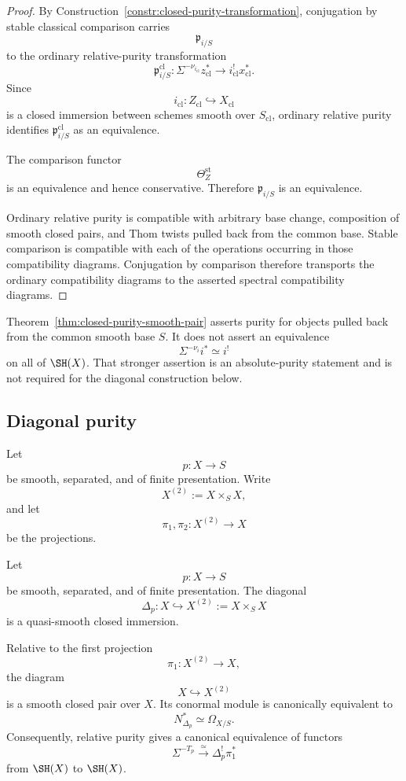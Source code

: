 \begin{proof}
By Construction~\ref{constr:closed-purity-transformation}, conjugation by
stable classical comparison carries
\[
    \mathfrak p_{i/S}
\]
to the ordinary relative-purity transformation
\[
    \mathfrak p^{\mathrm{cl}}_{i/S}:
    \Sigma^{-\nu_{i_{\mathrm{cl}}}}
    z_{\mathrm{cl}}^*
    \longrightarrow
    i_{\mathrm{cl}}^!x_{\mathrm{cl}}^*.
\]
Since
\[
    i_{\mathrm{cl}}:
    Z_{\mathrm{cl}}
    \hookrightarrow
    X_{\mathrm{cl}}
\]
is a closed immersion between schemes smooth over \(S_{\mathrm{cl}}\),
ordinary relative purity identifies
\(\mathfrak p^{\mathrm{cl}}_{i/S}\) as an equivalence.

The comparison functor
\[
    \Theta_Z^{\mathrm{st}}
\]
is an equivalence and hence conservative.  Therefore
\(\mathfrak p_{i/S}\) is an equivalence.

Ordinary relative purity is compatible with arbitrary base change,
composition of smooth closed pairs, and Thom twists pulled back from the
common base.  Stable comparison is
compatible with each of the operations occurring in those compatibility
diagrams.  Conjugation by comparison therefore transports the ordinary
compatibility diagrams to the asserted spectral compatibility diagrams.
\end{proof}

\begin{remark}
\label{rem:closed-purity-scope}
Theorem~\ref{thm:closed-purity-smooth-pair} asserts purity for objects pulled
back from the common smooth base \(S\).  It does not assert an equivalence
\[
    \Sigma^{-\nu_i}i^*
    \simeq
    i^!
\]
on all of \(\SH(X)\).  That stronger assertion is an absolute-purity
statement and is not required for the diagonal construction below.
\end{remark}

\subsection{Diagonal purity}

Let
\[
    p:X\longrightarrow S
\]
be smooth, separated, and of finite presentation.  Write
\[
    X^{(2)}
    :=
    X\times_SX,
\]
and let
\[
    \pi_1,\pi_2:X^{(2)}\longrightarrow X
\]
be the projections.

\begin{proposition}
\label{prop:smooth-diagonal-purity}
Let
\[
    p:X\longrightarrow S
\]
be smooth, separated, and of finite presentation.  The diagonal
\[
    \Delta_p:
    X\hookrightarrow X^{(2)}
    :=
    X\times_SX
\]
is a quasi-smooth closed immersion.

Relative to the first projection
\[
    \pi_1:X^{(2)}\longrightarrow X,
\]
the diagram
\[
    X\hookrightarrow X^{(2)}
\]
is a smooth closed pair over \(X\).  Its conormal module is canonically
equivalent to
\[
    N^*_{\Delta_p}
    \simeq
    \Omega_{X/S}.
\]
Consequently, relative purity gives a canonical equivalence of functors
\[
    \Sigma^{-T_p}
    \xrightarrow{\simeq}
    \Delta_p^!\pi_1^*
\]
from \(\SH(X)\) to \(\SH(X)\).
\end{proposition}


